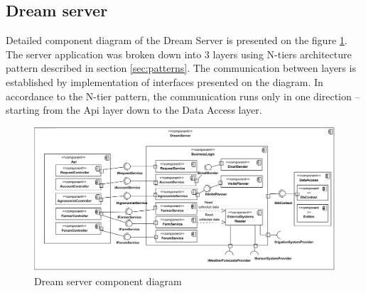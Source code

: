 \subsection{Dream server}\label{subsec:backend-components}
Detailed component diagram of the Dream Server is presented on the figure \ref{fig:backend-components}. The server application was broken down into 3 layers using N-tiers architecture pattern described in section \ref{sec:patterns}. The communication between layers is established by implementation of interfaces presented on the diagram. In accordance to the N-tier pattern, the communication runs only in one direction – starting from the Api layer down to the Data Access layer. 

\begin{figure}[H]
    \centering
    \includegraphics[scale=0.58, origin=c]
    {diagrams/component/BackendComponents.png}
    \caption{Dream server component diagram}
    \label{fig:backend-components}
\end{figure}


